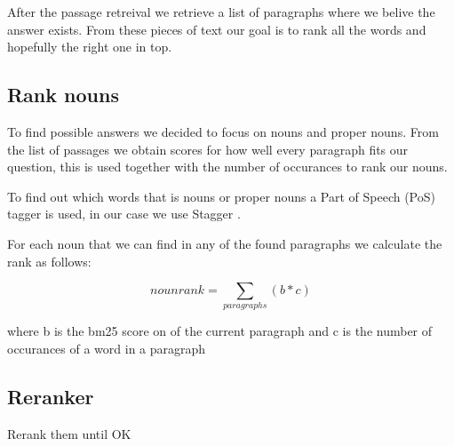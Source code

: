 After the passage retreival we retrieve a list of paragraphs where we belive the answer exists. 
From these pieces of text our goal is to rank all the words and hopefully the right one in top.

\subsection{Rank nouns}

To find possible answers we decided to focus on nouns and proper nouns. 
From the list of passages we obtain scores for how well every paragraph fits our question, 
this is used together with the number of occurances to rank our nouns.

To find out which words that is nouns or proper nouns a Part of Speech (PoS) tagger is used, in our case we use Stagger \cite{stagger}.

For each noun that we can find in any of the found paragraphs we calculate the rank as follows:

\[ nounrank = \sum_{paragraphs}(b*c) \]

where b is the bm25 score on of the current paragraph and c is the number of occurances of a word in a paragraph

\subsection{Reranker}

Rerank them until OK


